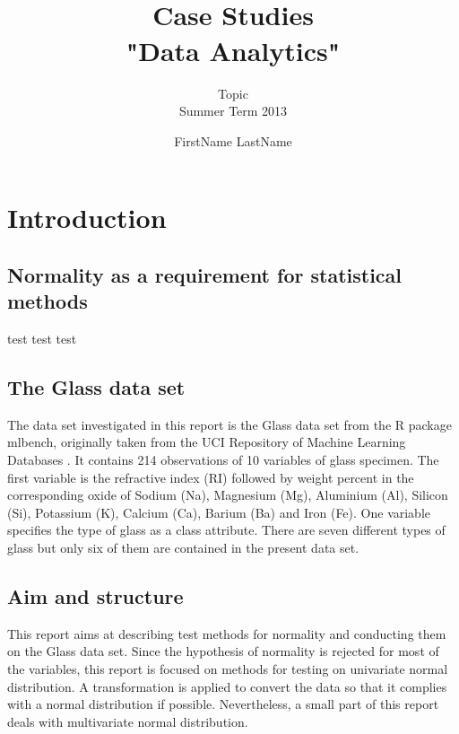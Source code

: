 \documentclass[a4paper, 12pt, titlepage, headsepline, listof = totoc, bibliography = totoc, numbers = noenddot]{scrartcl}
\title{\hrulefill \\ \vspace*{1cm} Case Studies\\\vspace*{0.5cm}
 "Data Analytics" \\ \vspace*{1cm}\hrulefill\vspace*{1.5cm}}
\subtitle{Topic\\\vspace*{1.5cm} Summer Term 2013\vspace*{1.5cm}}
\author{FirstName LastName}
\begin{document}

\thispagestyle{empty}
\maketitle


\thispagestyle{empty}
\tableofcontents


\newpage
\setcounter{page}{1}
\section{Introduction}

\subsection{Normality as a requirement for statistical methods}

test test test

\subsection{The Glass data set}

The data set investigated in this report is the Glass data set from the R package mlbench, originally taken from the UCI Repository of Machine Learning Databases \cite{uci}. It contains 214 observations of 10 variables of glass specimen. The first variable is the refractive index (RI) followed by weight percent in the corresponding oxide of Sodium (Na), Magnesium (Mg), Aluminium (Al), Silicon (Si), Potassium (K), Calcium (Ca), Barium (Ba) and Iron (Fe). One variable specifies the type of glass as a class attribute. There are seven different types of glass but only six of them are contained in the present data set.

\subsection{Aim and structure}

This report aims at describing test methods for normality and conducting them on the Glass data set. Since the hypothesis of normality is rejected for most of the variables, this report is focused on methods for testing on univariate normal distribution. A transformation is applied to convert the data so that it complies with a normal distribution if possible. Nevertheless, a small part of this report deals with multivariate normal distribution.
\end{document}
